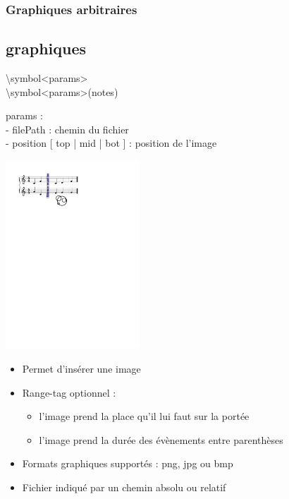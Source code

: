 \documentclass[12pt]{beamer}
\newenvironment{code}
  {\fontfamily{prc}\selectfont}{}
\begin{document}
    \begin{frame}
    \frametitle{Graphiques arbitraires}
    \subsection{graphiques}
   
    \begin{code} 
    \textbackslash{}symbol\textless{}params\textgreater{}\\
    \textbackslash{}symbol\textless{}params\textgreater{}(notes)\\
    \end{code}
    
    \begin{multicols}{2}
    
   \begin{code}
    params :\\
     - filePath : chemin du fichier\\
     - position  [ top | mid | bot ] : position de l’image
    \end{code}
    
    \columnbreak
    \includegraphics[width=5cm]{img/partitions/symbol.pdf}
    
    \end{multicols}
    
    \vspace{-10mm}
    \begin{itemize}
      \item Permet d'insérer une image
      \item Range-tag optionnel : \begin{itemize}
        \item l'image prend la place qu'il lui faut sur la portée
        \item l'image prend la durée des évènements entre parenthèses
      \end{itemize}
      \item Formats graphiques supportés : png, jpg ou bmp
      \item Fichier indiqué par un chemin absolu ou relatif
    \end{itemize}
    
    \end{frame}
\end{document}
